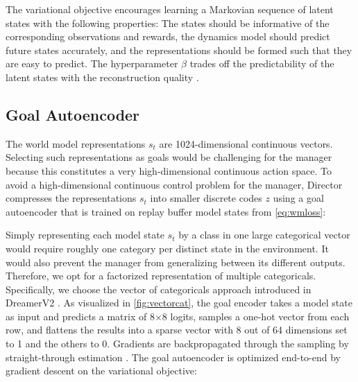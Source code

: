 
The variational objective encourages learning a Markovian sequence of latent states with the following properties: The states should be informative of the corresponding observations and rewards, the dynamics model should predict future states accurately, and the representations should be formed such that they are easy to predict.
The hyperparameter $\beta$ trades off the predictability of the latent states with the reconstruction quality \citep{beattie2016dmlab,alemi2018broken}.

\subsection{Goal Autoencoder}
\label{sec:ae}

The world model representations $s_t$ are 1024-dimensional continuous vectors.
Selecting such representations as goals would be challenging for the manager because this constitutes a very high-dimensional continuous action space.
To avoid a high-dimensional continuous control problem for the manager, Director compresses the representations $s_t$ into smaller discrete codes $z$ using a goal autoencoder that is trained on replay buffer model states from \cref{eq:wmloss}:


Simply representing each model state $s_t$ by a class in one large categorical vector would require roughly one category per distinct state in the environment. 
It would also prevent the manager from generalizing between its different outputs. 
Therefore, we opt for a factorized representation of multiple categoricals.
Specifically, we choose the vector of categoricals approach introduced in DreamerV2 \cite{hafner2020dreamerv2}. 
As visualized in \cref{fig:vectorcat}, the goal encoder takes a model state as input and predicts a matrix of 8$\times$8 logits, samples a one-hot vector from each row, and flattens the results into a sparse vector with 8 out of 64 dimensions set to 1 and the others to 0. 
Gradients are backpropagated through the sampling by straight-through estimation \citep{bengio2013straight}. 
The goal autoencoder is optimized end-to-end by gradient descent on the variational objective:

